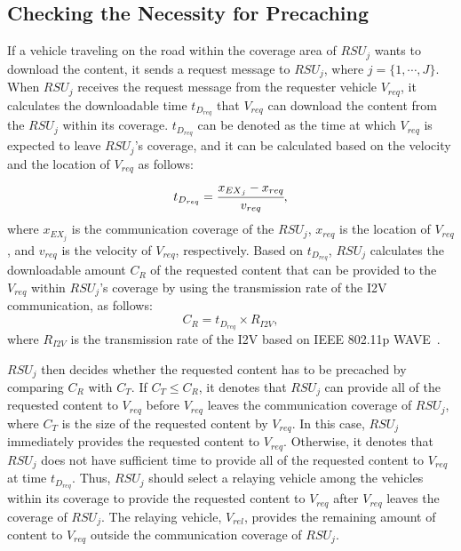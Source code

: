 \documentclass[electronics,aricle,accept,pdftex,moreauthors]{Definitions/mdpi}
\begin{document}
\subsection{Checking the Necessity for Precaching} \label{sec3.1}
If a vehicle traveling on the road within the coverage area of $RSU_{j}$ wants to download the content, it sends a request message to $RSU_{j}$, where $j=\{1, \cdots, J\}$.
When $RSU_{j}$ receives the request message from the requester vehicle $V_{req}$, it calculates the downloadable time ${t}_{{D}_{req}}$ that $V_{req}$ can download the content from the $RSU_{j}$ within its coverage.
${t}_{{D}_{req}}$ can be denoted as the time at which $V_{req}$ is expected to leave $RSU_{j}$'s coverage, and it can be calculated based on the velocity and the location of $V_{req}$ as follows:
\begin{equation}
     {t}_{{D}_{req}}=\cfrac{{x}_{{EX}_{j}}-{x}_{req}}{{v}_{req}}, %
\end{equation}
where ${x}_{{EX}_{j}}$ is the communication coverage of the $RSU_{j}$, $x_{req}$ is the location of $V_{req}$, and $v_{req}$ is the velocity of $V_{req}$, respectively.
Based on $t_{D_{req}}$, $RSU_{j}$ calculates the downloadable amount ${C}_{R}$ of the requested content that can be provided to the $V_{req}$ within $RSU_{j}$'s coverage by using the transmission rate of the I2V communication, as follows:
\begin{equation}
     {C}_{R}={t}_{{D}_{req}} \times {R}_{I2V}, %
\end{equation}
where $R_{I2V}$ is the transmission rate of the I2V based on IEEE 802.11p WAVE~\cite{wave2016}.

$RSU_{j}$ then decides whether the requested content has to be precached by comparing $C_{R}$ with $C_{T}$.
If ${C}_{T}\leq{C}_{R}$, it denotes that $RSU_{j}$ can provide all of the requested content to $V_{req}$ before $V_{req}$ leaves the communication coverage of $RSU_{j}$, where $C_{T}$ is the size of the requested content by $V_{req}$.
In this case, $RSU_{j}$ immediately provides the requested content to $V_{req}$.
Otherwise, it denotes that $RSU_{j}$ does not have sufficient time to provide all of the requested content to $V_{req}$ at time $t_{D_{req}}$.
Thus, $RSU_{j}$ should select a relaying vehicle among the vehicles within its coverage to provide the requested content to $V_{req}$ after $V_{req}$ leaves the coverage of $RSU_{j}$.
The relaying vehicle, $V_{rel}$, provides the remaining amount of content to $V_{req}$ outside the communication coverage of $RSU_{j}$.
\end{document}
